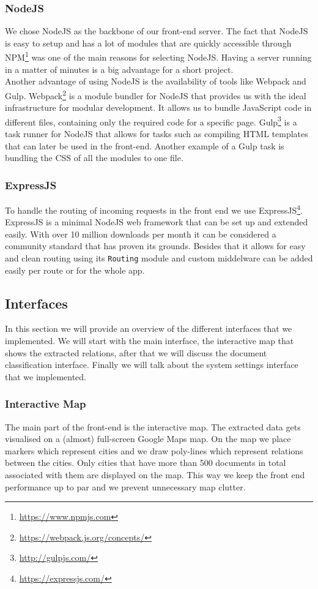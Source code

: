\subsubsection{NodeJS}
We chose NodeJS as the backbone of our front-end server. The fact that NodeJS is easy to setup and has a lot of modules that are quickly accessible through NPM\footnote{\url{https://www.npmjs.com}} was one of the main reasons for selecting NodeJS. Having a server running in a matter of minutes is a big advantage for a short project.\\
Another advantage of using NodeJS is the availability of tools like Webpack and Gulp. Webpack\footnote{\url{https://webpack.js.org/concepts/}} is a module bundler for NodeJS that provides us with the ideal infrastructure for modular development. It allows us to bundle JavaScript code in different files, containing only the required code for a specific page. Gulp\footnote{\url{http://gulpjs.com/}} is a task runner for NodeJS that allows for tasks such as compiling HTML templates that can later be used in the front-end. Another example of a Gulp task is bundling the CSS of all the modules to one file.
\subsubsection{ExpressJS}

To handle the routing of incoming requests in the front end we use ExpressJS\footnote{\url{https://expressjs.com/}}. ExpressJS is a minimal NodeJS web framework that can be set up and extended easily. With over 10 million downloads per month it can be considered a community standard that has proven its grounds. Besides that it allows for easy and clean routing using its \texttt{Routing} module and custom middelware can be added easily per route or for the whole app.

\subsection{Interfaces}
In this section we will provide an overview of the different interfaces that we implemented. We will start with the main interface, the interactive map that shows the extracted relations, after that we will discuss the document classification interface. Finally we will talk about the system settings interface that we implemented.

\subsubsection{Interactive Map}
The main part of the front-end is the interactive map. The extracted data gets visualised on a (almost) full-screen Google Maps map. On the map we place markers which represent cities and we draw poly-lines which represent relations between the cities. Only cities that have more than 500 documents in total associated with them are displayed on the map. This way we keep the front end performance up to par and we prevent unnecessary map clutter.

